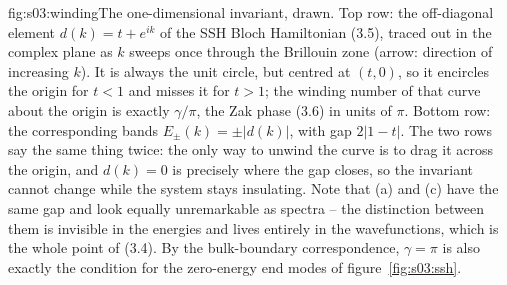 %
\begin{aqmfigure}{fig:s03:winding}{The one-dimensional invariant, drawn. Top row: the off-diagonal
element $d(k)=t+e^{ik}$ of the SSH Bloch Hamiltonian (3.5), traced out in the complex plane as $k$
sweeps once through the Brillouin zone (arrow: direction of increasing $k$). It is always the unit
circle, but centred at $(t,0)$, so it encircles the origin for $t<1$ and misses it for $t>1$; the
winding number of that curve about the origin is exactly $\gamma/\pi$, the Zak phase (3.6) in units
of $\pi$. Bottom row: the corresponding bands $E_\pm(k)=\pm|d(k)|$, with gap $2|1-t|$. The two rows
say the same thing twice: the only way to unwind the curve is to drag it across the origin, and
$d(k)=0$ is precisely where the gap closes, so the invariant cannot change while the system stays
insulating. Note that (a) and (c) have the same gap and look equally unremarkable as spectra --
the distinction between them is invisible in the energies and lives entirely in the wavefunctions,
which is the whole point of (3.4). By the bulk-boundary correspondence, $\gamma=\pi$ is also exactly
the condition for the zero-energy end modes of figure~\ref{fig:s03:ssh}.}

\end{aqmfigure}
